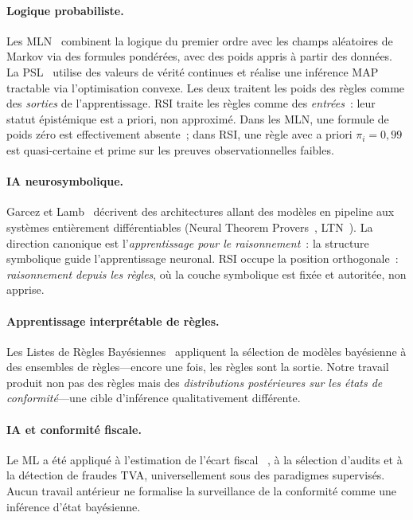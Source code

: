 \documentclass[letterpaper]{article}
\begin{document}
\paragraph{Logique probabiliste.}
Les MLN~\citep{richardson2006markov} combinent la logique du premier
ordre avec les champs al\'eatoires de Markov via des formules pond\'er\'ees,
avec des poids appris \`a partir des donn\'ees.
La PSL~\citep{bach2017hinge} utilise des valeurs de v\'erit\'e continues
et r\'ealise une inf\'erence MAP tractable via l'optimisation convexe.
Les deux traitent les poids des r\`egles comme des \emph{sorties} de
l'apprentissage. RSI traite les r\`egles comme des \emph{entr\'ees}~:
leur statut \'epist\'emique est a priori, non approxim\'e.
Dans les MLN, une formule de poids z\'ero est effectivement absente~;
dans RSI, une r\`egle avec a priori $\pi_i = 0,99$ est quasi-certaine
et prime sur les preuves observationnelles faibles.

\paragraph{IA neurosymbolique.}
Garcez et Lamb~\citeyearpar{garcez2022neural} d\'ecrivent des architectures
allant des mod\`eles en pipeline aux syst\`emes enti\`erement
diff\'erentiables (Neural Theorem Provers~\citep{rocktaschel2017end},
LTN~\citep{badreddine2022logic}). La direction canonique est
l'\emph{apprentissage pour le raisonnement}~: la structure symbolique
guide l'apprentissage neuronal. RSI occupe la position orthogonale~:
\emph{raisonnement depuis les r\`egles}, o\`u la couche symbolique est
fix\'ee et autorit\'ee, non apprise.

\paragraph{Apprentissage interpr\'etable de r\`egles.}
Les Listes de R\`egles Bay\'esiennes~\citep{letham2015interpretable}
appliquent la s\'election de mod\`eles bay\'esienne \`a des ensembles
de r\`egles---encore une fois, les r\`egles sont la sortie.
Notre travail produit non pas des r\`egles mais des \emph{distributions
post\'erieures sur les \'etats de conformit\'e}---une cible d'inf\'erence
qualitativement diff\'erente.

\paragraph{IA et conformit\'e fiscale.}
Le ML a \'et\'e appliqu\'e \`a l'estimation de l'\'ecart fiscal
~\citep{gomes2022machine}, \`a la s\'election d'audits et \`a la
d\'etection de fraudes TVA, universellement sous des paradigmes
supervis\'es. Aucun travail ant\'erieur ne formalise la surveillance
de la conformit\'e comme une inf\'erence d'\'etat bay\'esienne.
\end{document}
